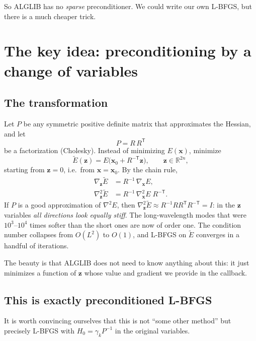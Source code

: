 \documentclass[11pt,a4paper]{article}
\theoremstyle{remark}
\newcommand{\R}{\mathbb{R}}
\newcommand{\x}{\bm{x}}
\newcommand{\z}{\bm{z}}
\newcommand{\T}{^{\mathsf T}}
\newcommand{\mT}{^{-\mathsf T}}
\begin{document}
So ALGLIB has no \emph{sparse} preconditioner. We could write our own L-BFGS, but there is a
much cheaper trick.

\section{The key idea: preconditioning by a change of variables}
\label{sec:change}

\subsection{The transformation}

Let $P$ be any symmetric positive definite matrix that approximates the Hessian, and let
\begin{equation}
P = R\,R\T
\end{equation}
be a factorization (Cholesky). Instead of minimizing $E(\x)$, minimize
\begin{equation}
\tilde E(\z) = E\big(\x_0 + R\mT\z\big),\qquad \z\in\R^{2n},
\label{eq:cov}
\end{equation}
starting from $\z=0$, i.e.\ from $\x=\x_0$. By the chain rule,
\begin{align}
\nabla_{\z}\tilde E &= R^{-1}\,\nabla_{\x}E, \label{eq:gz}\\
\nabla^2_{\z}\tilde E &= R^{-1}\,\nabla^2_{\x}E\;R\mT . \label{eq:Hz}
\end{align}
If $P$ is a good approximation of $\nabla^2E$, then $\nabla^2_{\z}\tilde E\approx
R^{-1}RR\T R\mT = I$: in the $\z$ variables \emph{all directions look equally stiff}. The
long-wavelength modes that were $10^3$--$10^4$ times softer than the short ones are now of
order one. The condition number collapses from $O(L^2)$ to $O(1)$, and L-BFGS on
$\tilde E$ converges in a handful of iterations.

The beauty is that ALGLIB does not need to know anything about this: it just minimizes a
function of $\z$ whose value and gradient we provide in the callback.

\subsection{This is exactly preconditioned L-BFGS}

It is worth convincing ourselves that this is not ``some other method'' but precisely
L-BFGS with $H_0 = \gamma_k P^{-1}$ in the original variables.
\end{document}
